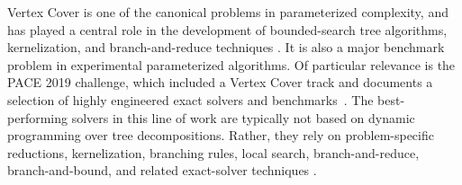 {\sc Vertex Cover} is one of the canonical problems in parameterized
complexity, and has played a central role in the development of bounded-search
tree algorithms, kernelization, and branch-and-reduce techniques
\cite{NemhauserTrotter1975,DBLP:conf/alenex/Abu-KhzamCFLSS04,CHEN20103736}.
It is also a major benchmark problem in experimental parameterized algorithms.
Of particular relevance is the PACE 2019 challenge, which included a
{\sc Vertex Cover} track and documents a selection of highly engineered
exact solvers and benchmarks~\cite{dzulfikar_et_al:LIPIcs.IPEC.2019.25}.
The best-performing solvers in this line of work are typically not based on
dynamic programming over tree decompositions. Rather, they rely on
problem-specific reductions, kernelization, branching rules, local search,
branch-and-reduce, branch-and-bound, and related exact-solver techniques
\cite{AKIBA2016211,HespeLammSchulzStrash2019,CaiLinLuo2017}.
